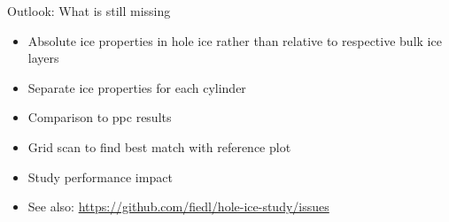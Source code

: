 
\begin{frame}{Outlook: What is still missing}
  \begin{itemize}
    \item Absolute ice properties in hole ice rather than relative to respective bulk ice layers
    \item Separate ice properties for each cylinder
    \item Comparison to ppc results
    \item Grid scan to find best match with reference plot
    \item Study performance impact
    \item See also: \url{https://github.com/fiedl/hole-ice-study/issues}
  \end{itemize}
\end{frame}
